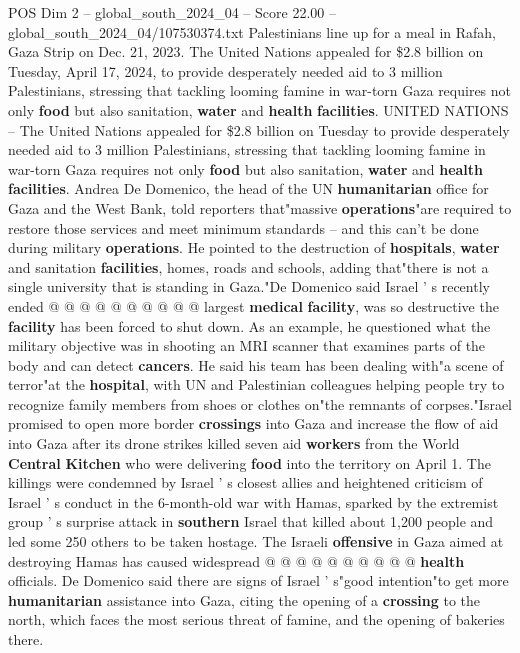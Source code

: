 \begin{textsample}{POS Dim 2 – global\_south\_2024\_04 – Score 22.00 – global\_south\_2024\_04/107530374.txt}  \label{ex:f2_pos_159}
Palestinians line up for a meal in Rafah, Gaza Strip on Dec. 21, 2023.
The United Nations appealed for \$2.8 billion on Tuesday, April 17, 2024, to provide desperately needed aid to 3 million Palestinians, stressing that tackling looming famine in war-torn Gaza requires not only \textbf{food} but also sanitation, \textbf{water} and \textbf{health} \textbf{facilities}.
UNITED NATIONS -- The United Nations appealed for \$2.8 billion on Tuesday to provide desperately needed aid to 3 million Palestinians, stressing that tackling looming famine in war-torn Gaza requires not only \textbf{food} but also sanitation, \textbf{water} and \textbf{health} \textbf{facilities}.
Andrea De Domenico, the head of the UN \textbf{humanitarian} office for Gaza and the West Bank, told reporters that"massive \textbf{operations}"are required to restore those services and meet minimum standards -- and this can't be done during military \textbf{operations}.
He pointed to the destruction of \textbf{hospitals}, \textbf{water} and sanitation \textbf{facilities}, homes, roads and schools, adding that"there is not a single university that is standing in Gaza."De Domenico said Israel ' s recently ended @ @ @ @ @ @ @ @ @ @ largest \textbf{medical} \textbf{facility}, was so destructive the \textbf{facility} has been forced to shut down.
As an example, he questioned what the military objective was in shooting an MRI scanner that examines parts of the body and can detect \textbf{cancers}.
He said his team has been dealing with"a scene of terror"at the \textbf{hospital}, with UN and Palestinian colleagues helping people try to recognize family members from shoes or clothes on"the remnants of corpses."Israel promised to open more border \textbf{crossings} into Gaza and increase the flow of aid into Gaza after its drone strikes killed seven aid \textbf{workers} from the World \textbf{Central} \textbf{Kitchen} who were delivering \textbf{food} into the territory on April 1.
The killings were condemned by Israel ' s closest allies and heightened criticism of Israel ' s conduct in the 6-month-old war with Hamas, sparked by the extremist group ' s surprise attack in \textbf{southern} Israel that killed about 1,200 people and led some 250 others to be taken hostage.
The Israeli \textbf{offensive} in Gaza aimed at destroying Hamas has caused widespread @ @ @ @ @ @ @ @ @ @ \textbf{health} officials.
De Domenico said there are signs of Israel ' s"good intention"to get more \textbf{humanitarian} assistance into Gaza, citing the opening of a \textbf{crossing} to the north, which faces the most serious threat of famine, and the opening of bakeries there.

\end{textsample}
